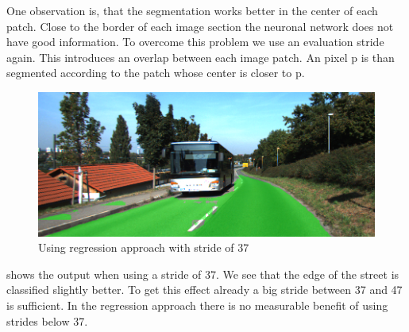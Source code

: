 One observation is, that the segmentation works better in the center of each patch. Close to the border of each image section the neuronal network does not have good information. To overcome this problem we use an evaluation stride again. This introduces an overlap between each image patch. An pixel p is than segmented according to the patch whose center is closer to p.




\begin{figure}[H]
	\centering
	\includegraphics[width=\columnwidth]{figures/models/testing2-um_32_conv_stride37.png}
	\caption{Using regression approach with stride of 37}
	\label{fig:reg_stride37}
\end{figure}

 shows the output when using a stride of 37. We see that the edge of the street is classified slightly better. To get this effect already a big stride between 37 and 47 is sufficient. In the regression approach there is no measurable benefit of using strides below 37.

